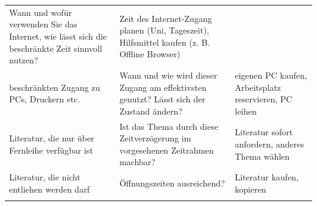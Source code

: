 \documentclass[]{book}
\theoremstyle{definition}
\theoremstyle{definition}
\theoremstyle{definition}
\theoremstyle{remark}
\begin{document}
\begin{longtable}[]{@{}lll@{}}
\begin{minipage}[t]{0.30\columnwidth}
Wann und wofür verwenden Sie das Internet, wie lässt sich die
beschränkte Zeit sinnvoll nutzen?\strut
\end{minipage} & \begin{minipage}[t]{0.35\columnwidth}\raggedright\strut
Zeit des Internet-Zugang planen (Uni, Tageszeit), Hilfsmittel kaufen (z.
B. Offline Browser) \vspace{5mm}\strut
\end{minipage}\tabularnewline
\begin{minipage}[t]{0.26\columnwidth}\raggedright\strut
beschränkten Zugang zu PCs, Druckern etc.\strut
\end{minipage} & \begin{minipage}[t]{0.30\columnwidth}\raggedright\strut
Wann und wie wird dieser Zugang am effektivsten genutzt? Lässt sich der
Zustand ändern?\strut
\end{minipage} & \begin{minipage}[t]{0.35\columnwidth}\raggedright\strut
eigenen PC kaufen, Arbeitsplatz reservieren, PC leihen\vspace{5mm}\strut
\end{minipage}\tabularnewline
\begin{minipage}[t]{0.26\columnwidth}\raggedright\strut
Literatur, die nur über Fernleihe verfügbar ist\strut
\end{minipage} & \begin{minipage}[t]{0.30\columnwidth}\raggedright\strut
Ist das Thema durch diese Zeitverzögerung im vorgesehenen Zeitrahmen
machbar?\strut
\end{minipage} & \begin{minipage}[t]{0.35\columnwidth}\raggedright\strut
Literatur sofort anfordern, anderes Thema wählen\vspace{5mm}\strut
\end{minipage}\tabularnewline
\begin{minipage}[t]{0.26\columnwidth}\raggedright\strut
Literatur, die nicht entliehen werden darf\strut
\end{minipage} & \begin{minipage}[t]{0.30\columnwidth}\raggedright\strut
Öffnungszeiten ausreichend?\strut
\end{minipage} & \begin{minipage}[t]{0.35\columnwidth}\raggedright\strut
Literatur kaufen, kopieren\vspace{5mm}\strut
\end{minipage}\tabularnewline
\begin{minipage}[t]{0.26\columnwidth}\raggedright\strut

\end{minipage}
\end{longtable}
\end{document}
